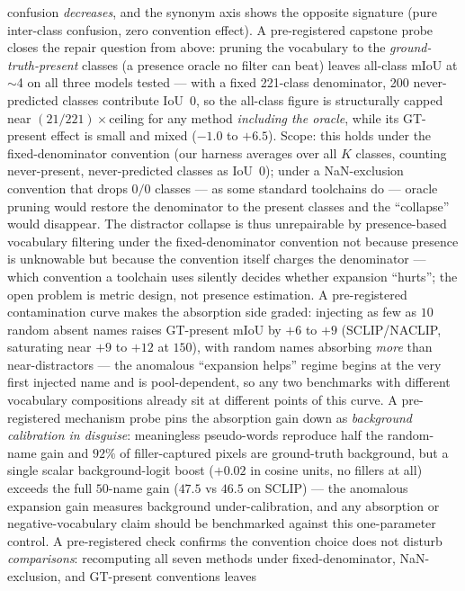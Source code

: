 \documentclass[11pt]{article}
\newcommand{\miou}{mIoU}
\begin{document}
confusion \emph{decreases}, and the synonym axis shows the opposite signature
(pure inter-class confusion, zero convention effect). A pre-registered
capstone probe closes the repair question from above: pruning the
vocabulary to the \emph{ground-truth-present} classes (a presence oracle
no filter can beat) leaves all-class \miou{} at $\sim$4 on all three
models tested --- with a fixed 221-class denominator, 200 never-predicted
classes contribute IoU~0, so the all-class figure is structurally capped
near $(21/221)\times$ceiling for any method \emph{including the oracle},
while its GT-present effect is small and mixed ($-1.0$ to $+6.5$). Scope:
this holds under the fixed-denominator convention (our harness averages
over all $K$ classes, counting never-present, never-predicted classes as
IoU~0); under a NaN-exclusion convention that drops $0/0$ classes --- as
some standard toolchains do --- oracle pruning would restore the
denominator to the present classes and the ``collapse'' would disappear.
The distractor collapse is thus unrepairable by presence-based vocabulary
filtering under the fixed-denominator convention not because presence is
unknowable but because the convention itself charges the denominator ---
which convention a toolchain uses silently decides whether expansion
``hurts''; the open problem is metric design, not presence estimation.
A pre-registered contamination curve makes the absorption side graded:
injecting as few as $10$ random absent names raises GT-present \miou{}
by $+6$ to $+9$ (SCLIP/NACLIP, saturating near $+9$ to $+12$ at $150$),
with random names absorbing \emph{more} than near-distractors --- the
anomalous ``expansion helps'' regime begins at the very first injected
name and is pool-dependent, so any two benchmarks with different
vocabulary compositions already sit at different points of this curve.
A pre-registered mechanism probe pins the absorption gain down as
\emph{background calibration in disguise}: meaningless pseudo-words
reproduce half the random-name gain and $92\%$ of filler-captured
pixels are ground-truth background, but a single scalar background-logit
boost ($+0.02$ in cosine units, no fillers at all) exceeds the full
$50$-name gain ($47.5$ vs $46.5$ on SCLIP) --- the anomalous expansion
gain measures background under-calibration, and any absorption or
negative-vocabulary claim should be benchmarked against this
one-parameter control.
A pre-registered check confirms the convention choice does not disturb
\emph{comparisons}: recomputing all seven methods under
fixed-denominator, NaN-exclusion, and GT-present conventions leaves
\end{document}
